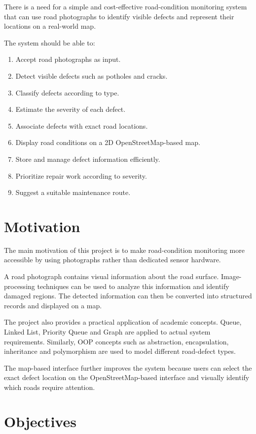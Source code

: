 \documentclass[12pt,a4paper]{article}
\begin{document}
There is a need for a simple and cost-effective road-condition monitoring system that can use road photographs to identify visible defects and represent their locations on a real-world map.

The system should be able to:
\begin{enumerate}[leftmargin=*]
    \item Accept road photographs as input.
    \item Detect visible defects such as potholes and cracks.
    \item Classify defects according to type.
    \item Estimate the severity of each defect.
    \item Associate defects with exact road locations.
    \item Display road conditions on a 2D OpenStreetMap-based map.
    \item Store and manage defect information efficiently.
    \item Prioritize repair work according to severity.
    \item Suggest a suitable maintenance route.
\end{enumerate}

\section{Motivation}

The main motivation of this project is to make road-condition monitoring more accessible by using photographs rather than dedicated sensor hardware.

A road photograph contains visual information about the road surface. Image-processing techniques can be used to analyze this information and identify damaged regions. The detected information can then be converted into structured records and displayed on a map.

The project also provides a practical application of academic concepts. Queue, Linked List, Priority Queue and Graph are applied to actual system requirements. Similarly, OOP concepts such as abstraction, encapsulation, inheritance and polymorphism are used to model different road-defect types.

The map-based interface further improves the system because users can select the exact defect location on the OpenStreetMap-based interface and visually identify which roads require attention.

\section{Objectives}
\end{document}
